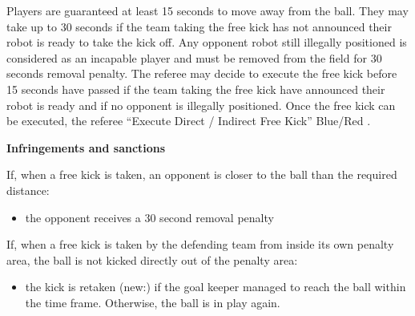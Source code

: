 Players are guaranteed at least 15 seconds to move away from the ball.
They may take up to 30 seconds if the team taking the free kick has not
announced their robot is ready to take the kick off.
Any opponent robot still illegally positioned is considered as an incapable
player and must be removed from the field for 30 seconds removal penalty.
The referee may decide to execute the free kick before 15 seconds have passed if
the team taking the free kick have announced their robot is ready and if no
opponent is illegally positioned.
Once the free kick can be executed, the referee   ``Execute Direct / Indirect Free Kick'' Blue/Red .

\bigskip

{\bfseries Infringements and sanctions}

\headlinebox

If, when a free kick is taken, an opponent is closer to the ball than the required distance:

\begin{itemize}
\item the opponent receives a 30 second removal penalty 
\end{itemize}

If, when a free kick is taken by the defending team from inside its own penalty area, the ball is not kicked directly out of the penalty area:


\begin{itemize}
\item the kick is retaken (new:)  if the goal keeper managed to reach the ball within the time frame. Otherwise, the ball is in play again.
\end{itemize}

\bigskip

